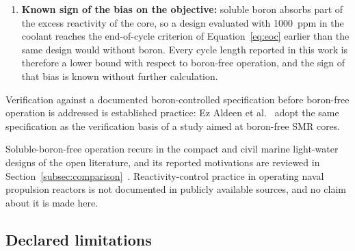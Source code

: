 \begin{enumerate}
\begin{enumerate}[label=\theenumi.\arabic*, ref=\theenumi.\arabic*]
          \item \textbf{A design configuration would need its own
                study:} fixing the banks would require a layout that
                meets the reactivity requirement at every state of the
                cycle and is mechanically achievable within the vessel
                head and the guide-tube pattern, together with a Cold
                Shutdown Margin (CSDM) demonstration under the
                single-failure assumption. That demonstration is outside
                the constraint set of every campaign.
        \end{enumerate}

        An SBF core adopted without that study would claim more than
        the present constraint set supports, so soluble boron is
        carried in every campaign of this work.
  \item \textbf{Known sign of the bias on the objective:} soluble
        boron absorbs part of the excess reactivity of the core, so a
        design evaluated with \SI{1000}{ppm} in the coolant reaches the
        end-of-cycle criterion of Equation~\eqref{eq:eoc} earlier than
        the same design would without boron. Every cycle length
        reported in this work is therefore a lower bound with respect
        to boron-free operation, and the sign of that bias is known
        without further calculation.
\end{enumerate}

Verification against a documented boron-controlled specification before
boron-free operation is addressed is established practice: Ez Aldeen et
al.~\cite{ez_aldeen_2025} adopt the same specification as the verification
basis of a study aimed at boron-free SMR cores.

Soluble-boron-free operation recurs in the compact and civil marine
light-water designs of the open literature, and its reported
motivations are reviewed in
Section~\ref{subsec:comparison}~\cite{kusunoki_mrx_2000,alam_partI_2019,alzaben_boronfree_2019,ismr_sbf_2024,rr_smr_atf_2025,song_sanchez_2026}.
Reactivity-control practice in operating naval propulsion reactors is
not documented in publicly available sources, and no claim about it is
made here.

\label{sec:meth-boron-bias}\label{eq:boron-rho-to-k}

\subsection{Declared limitations}
\label{sec:meth-boron-limits}

